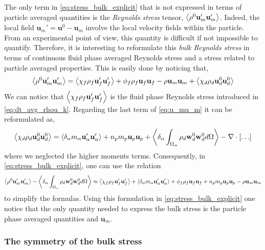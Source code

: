 The only term in \ref{eq:stress_bulk_explicit} that is not expressed in terms of particle averaged quantities is the \textit{Reynolds stress} tensor, $\left<\rho^0 \textbf{u}'_m\textbf{u}'_m\right>$. 
Indeed, the local field $\textbf{u}_m' = \textbf{u}^0 - \textbf{u}_m$ involve the local velocity fields within the particle.
From an experimental point of view, this quantity is difficult if not impossible to quantify.  
Therefore, it is interesting to reformulate this \textit{bulk Reynolds stress} in terms of continuous fluid phase averaged Reynolds stress and a stress related to particle averaged properties. 
This is easily done by noticing that, 
\begin{equation*}
    \left<\rho^0 \textbf{u}'_m\textbf{u}'_m\right>
    = 
    \left<\chi_f \rho_f \textbf{u}_f'\textbf{u}_f'\right>
    + \phi_f \rho_f \textbf{u}_f\textbf{u}_f
    - \rho \textbf{u}_m\textbf{u}_m
    + \left<\chi_d \rho_d \textbf{u}_d^0\textbf{u}_d^0\right>
    \label{eq:u_mu_m}
\end{equation*}
We can notice that $\left<\chi_f \rho_f \textbf{u}_f'\textbf{u}_f'\right>$ is the fluid phase Reynolds stress introduced in \ref{eq:dt_avg_rhou_k}. 
Regarding the last term of \ref{eq:u_mu_m} it can be reformulated as, 
\begin{equation*}
    \left<\chi_d \rho_d \textbf{u}_d^0\textbf{u}_d^0\right>
    = 
    \left<\delta_\alpha  m_\alpha \textbf{u}_\alpha' \textbf{u}_\alpha' \right>
    + n_p m_p \textbf{u}_p\textbf{u}_p
    + \left<\delta_\alpha \int_{\Omega_{\alpha}} \rho_d \textbf{w}_d^0 \textbf{w}_d^0 d\Omega\right>
    - \mathbf{\nabla}\cdot [\ldots]
\end{equation*}
where we neglected the higher moments terms. 
Consequently, in \ref{eq:stress_bulk_explicit}, one can use the relation 
\begin{equation*}
    \left<\rho^0 \textbf{u}'_m\textbf{u}'_m\right>
    - \left<\delta_\alpha \int_{\Omega_{\alpha}} \rho_d \textbf{w}_d^0 \textbf{w}_d^0 d\Omega\right>
    \approx 
    \left<\chi_f \rho_f \textbf{u}_f'\textbf{u}_f'\right>
    + \left<\delta_\alpha  m_\alpha \textbf{u}_\alpha'\textbf{u}_\alpha'\right>
    + \phi_f \rho_f \textbf{u}_f\textbf{u}_f
    + n_p m_p \textbf{u}_p\textbf{u}_p
    - \rho \textbf{u}_m\textbf{u}_m
\end{equation*}
to simplify the formulas. 
Using this formulation in \ref{eq:stress_bulk_explicit} one notice that the only quantity needed to express the bulk stress is the particle phase averaged quantities and $\textbf{u}_m$. 

\subsubsection{The symmetry of the bulk stress}

